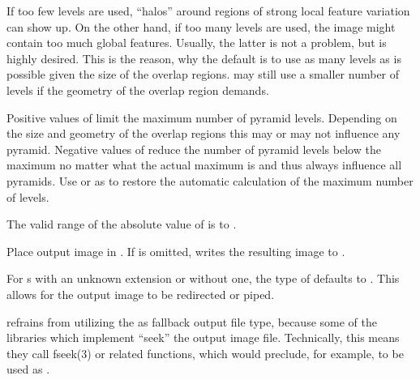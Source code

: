 \begin{codelist}
\begin{geeknote}
    If too few levels are used, ``halos'' around regions of strong local feature variation can
    show up.  On the other hand, if too many levels are used, the image might contain too much
    global features.  Usually, the latter is not a problem, but is highly desired.  This is the
    reason, why the default is to use as many levels as is possible given the size of the
    overlap regions.  \App{} may still use a smaller number of levels if the geometry of the
    overlap region demands.
  \end{geeknote}

  Positive values of  limit the maximum number of pyramid levels.  Depending on
  the size and geometry of the overlap regions this may or may not influence any pyramid.
  Negative values of  reduce the number of pyramid levels below the maximum no
  matter what the actual maximum is and thus always influence all pyramids.  Use 
  or  as  to restore the automatic calculation of the maximum
  number of levels.

  The valid range of the absolute value of  is 
  to .

  \label{opt:output}%
\item[\itempar{-o \metavar{FILE} \\ --output=\metavar{FILE}}]\itemend
  Place \appdid{} output image in .  If  is omitted, \App{}
  writes the resulting image to .

  For s with an unknown extension or without one, the type of 
  defaults to .  This allows for the output
  image to be redirected or piped.

  \begin{geeknote}
    \App{} refrains from utilizing the  as fallback output file type, because some
    of the libraries which implement  ``seek'' the output image file.
    Technically, this means they call fseek(3) or related functions, which would preclude, for
    example,  to be used as .


\end{geeknote}
\end{codelist}
